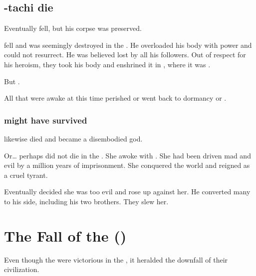 \subsection{\Sethicus-tachi die}
Eventually \Sethicus fell, but his corpse was preserved.

\Sethicus fell and was seemingly destroyed in the \firstbanewar.
He overloaded his body with power and could not resurrect.
He was believed lost by all his followers.
Out of respect for his heroism, they took his body and enshrined it in \Dathka, where it was . 

But .

All \dragons that were awake at this time perished or went back to dormancy or . 





\subsubsection{\Tiamat might have survived}
\Tiamat likewise died and became a disembodied god. 

Or\ldots{} perhaps \Tiamat did not die in the \firstbanewar.
She awoke with \Nexagglachel. 
She had been driven mad and evil by a million years of imprisonment.
She conquered the world and reigned as a cruel tyrant.

Eventually \Nexagglachel decided she was too evil and rose up against her.
He converted many \dragons to his side, including his two brothers. 
They slew her. 

















\section{The Fall of the \Ophidians ()}
Even though the \ophidians{} were victorious in the \firstbanewar{}, it  heralded the downfall of their civilization. 









